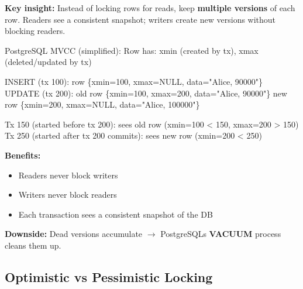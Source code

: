 \documentclass[11pt]{article}
\providecommand{\tightlist}{\setlength{\itemsep}{1pt}\setlength{\parskip}{0pt}}
\newenvironment{Shaded}{\begin{snugshade}}{\end{snugshade}}
\newcommand{\DecValTok}[1]{\textcolor[rgb]{0.96,0.45,0.00}{#1}}
\newcommand{\NormalTok}[1]{\textcolor[rgb]{0.81,0.81,0.76}{#1}}
\newcommand{\OperatorTok}[1]{\textcolor[rgb]{0.81,0.81,0.76}{#1}}
\newcommand{\StringTok}[1]{\textcolor[rgb]{0.96,0.31,0.31}{#1}}
\begin{document}
\textbf{Key insight:} Instead of locking rows for reads, keep \textbf{multiple versions} of each row. Readers see a consistent snapshot; writers create new versions without blocking readers.


\begin{Shaded}
\begin{Highlighting}[]
\NormalTok{PostgreSQL MVCC (simplified):}
\NormalTok{  Row has: xmin (created by tx), xmax (deleted}\OperatorTok{/}\NormalTok{updated by tx)}

\NormalTok{  INSERT (tx }\DecValTok{100}\NormalTok{): row \{xmin}\OperatorTok{=}\DecValTok{100}\NormalTok{, xmax}\OperatorTok{=}\NormalTok{NULL, data}\OperatorTok{=}\StringTok{"Alice, 90000"}\NormalTok{\}}
\NormalTok{  UPDATE (tx }\DecValTok{200}\NormalTok{): old row \{xmin}\OperatorTok{=}\DecValTok{100}\NormalTok{, xmax}\OperatorTok{=}\DecValTok{200}\NormalTok{, data}\OperatorTok{=}\StringTok{"Alice, 90000"}\NormalTok{\}}
\NormalTok{                   new row \{xmin}\OperatorTok{=}\DecValTok{200}\NormalTok{, xmax}\OperatorTok{=}\NormalTok{NULL, data}\OperatorTok{=}\StringTok{"Alice, 100000"}\NormalTok{\}}

\NormalTok{  Tx }\DecValTok{150}\NormalTok{ (started before tx }\DecValTok{200}\NormalTok{): sees old row (xmin}\OperatorTok{=}\DecValTok{100} \OperatorTok{\textless{}} \DecValTok{150}\NormalTok{, xmax}\OperatorTok{=}\DecValTok{200} \OperatorTok{\textgreater{}} \DecValTok{150}\NormalTok{)}
\NormalTok{  Tx }\DecValTok{250}\NormalTok{ (started after tx }\DecValTok{200}\NormalTok{ commits): sees new row (xmin}\OperatorTok{=}\DecValTok{200} \OperatorTok{\textless{}} \DecValTok{250}\NormalTok{)}
\end{Highlighting}
\end{Shaded}

\textbf{Benefits:}

\begin{itemize}
\tightlist
\item
  Readers never block writers
\item
  Writers never block readers
\item
  Each transaction sees a consistent snapshot of the DB
\end{itemize}

\textbf{Downside:} Dead versions accumulate \(\rightarrow\) PostgreSQL\textquotesingle s \textbf{VACUUM} process cleans them up.

\subsection{Optimistic vs Pessimistic Locking}\label{optimistic-vs-pessimistic-locking}
\end{document}
